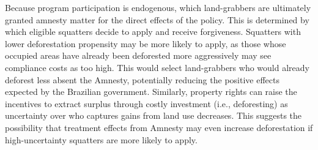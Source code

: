 \documentclass[12pt]{article}
\begin{document}
\quad Because program participation is endogenous, which land-grabbers are ultimately granted amnesty matter for the direct effects of the policy. This is determined by which eligible squatters decide to apply and receive forgiveness. Squatters with lower deforestation propensity may be more likely to apply, as those whose occupied areas have already been deforested more aggressively may see compliance costs as too high. This would select land-grabbers who would already deforest less absent the Amnesty, potentially reducing the positive effects expected by the Brazilian government. Similarly, property rights can raise the incentives to extract surplus through costly investment (i.e., deforesting) as uncertainty over who captures gains from land use decreases. This suggests the possibility that treatment effects from Amnesty may even increase deforestation if high-uncertainty squatters are more likely to apply.%
\
\end{document}
